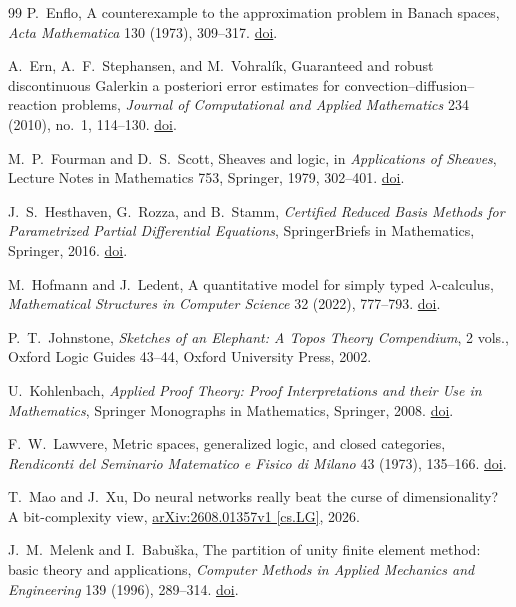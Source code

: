 \documentclass[11pt]{article}
\theoremstyle{definition}
\begin{document}
\begin{thebibliography}{99}
P.~Enflo,
A counterexample to the approximation problem in Banach spaces,
\emph{Acta Mathematica} 130 (1973), 309--317.
\href{https://doi.org/10.1007/BF02392270}{doi}.

A.~Ern, A.~F.~Stephansen, and M.~Vohral\'ik,
Guaranteed and robust discontinuous Galerkin a posteriori error estimates for
convection--diffusion--reaction problems,
\emph{Journal of Computational and Applied Mathematics} 234 (2010), no.~1, 114--130.
\href{https://doi.org/10.1016/j.cam.2009.12.009}{doi}.

M.~P.~Fourman and D.~S.~Scott,
Sheaves and logic,
in \emph{Applications of Sheaves}, Lecture Notes in Mathematics 753, Springer, 1979,
302--401. \href{https://doi.org/10.1007/BFb0061824}{doi}.

J.~S.~Hesthaven, G.~Rozza, and B.~Stamm,
\emph{Certified Reduced Basis Methods for Parametrized Partial Differential Equations},
SpringerBriefs in Mathematics, Springer, 2016.
\href{https://doi.org/10.1007/978-3-319-22470-1}{doi}.

M.~Hofmann and J.~Ledent,
A quantitative model for simply typed $\lambda$-calculus,
\emph{Mathematical Structures in Computer Science} 32 (2022), 777--793.
\href{https://doi.org/10.1017/S0960129521000256}{doi}.

P.~T.~Johnstone,
\emph{Sketches of an Elephant: A Topos Theory Compendium},
2 vols., Oxford Logic Guides 43--44, Oxford University Press, 2002.

U.~Kohlenbach,
\emph{Applied Proof Theory: Proof Interpretations and their Use in Mathematics},
Springer Monographs in Mathematics, Springer, 2008.
\href{https://doi.org/10.1007/978-3-540-77533-1}{doi}.

F.~W.~Lawvere,
Metric spaces, generalized logic, and closed categories,
\emph{Rendiconti del Seminario Matematico e Fisico di Milano} 43 (1973), 135--166.
\href{https://doi.org/10.1007/BF02924844}{doi}.

T.~Mao and J.~Xu,
Do neural networks really beat the curse of dimensionality? A bit-complexity view,
\href{https://arxiv.org/abs/2608.01357v1}{arXiv:2608.01357v1 [cs.LG]}, 2026.

J.~M.~Melenk and I.~Babu\v{s}ka,
The partition of unity finite element method: basic theory and applications,
\emph{Computer Methods in Applied Mechanics and Engineering} 139 (1996), 289--314.
\href{https://doi.org/10.1016/S0045-7825(96)01087-0}{doi}.


\end{thebibliography}
\end{document}
